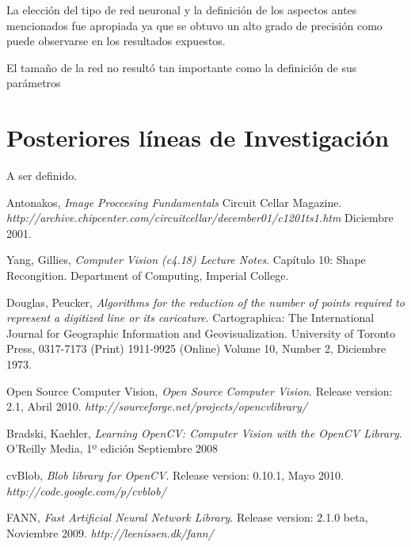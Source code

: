 \documentclass[pdftex,a4paper,12pt]{article}
\begin{document}
	La elecci\'on del tipo de red neuronal y la definici\'on de los aspectos antes mencionados
	fue apropiada ya que se obtuvo un alto grado de precisi\'on como puede observarse
	en los resultados expuestos.
	
	El tama\~no de la red no result\'o tan importante como la definici\'on de sus par\'ametros

\section{Posteriores l\'ineas de Investigaci\'on} %
A ser definido.

\newpage


\begin{thebibliography}{9}

  Antonakos,
  \emph{Image Proccesing Fundamentals}
  Circuit Cellar Magazine.
  \textsl{http://archive.chipcenter.com/circuitcellar/december01/c1201ts1.htm}
  Diciembre 2001.

  Yang, Gillies,  
  \emph{Computer Vision (c4.18) Lecture Notes}.
  Cap\'itulo 10: Shape Recongition.
  Department of Computing, Imperial College. 
  
  Douglas, Peucker, 
  \emph{Algorithms for the reduction of the number of points required to represent a digitized line or its caricature}. Cartographica: The International Journal for Geographic Information and Geovisualization.
  University of Toronto Press,
  0317-7173 (Print) 1911-9925 (Online)
  Volume 10, Number 2,
  Diciembre 1973.

  Open Source Computer Vision, 
  \emph{Open Source Computer Vision}. 
  Release version: 2.1, 
  Abril 2010.
  \textsl{http://sourceforge.net/projects/opencvlibrary/}
  
  Bradski, Kaehler,
  \emph{Learning OpenCV: Computer Vision with the OpenCV Library}.
  O'Reilly Media, 1º edici\'on 
  Septiembre 2008
  
  cvBlob, 
  \emph{Blob library for OpenCV}. 
  Release version: 0.10.1, 
  Mayo 2010.
  \textsl{http://code.google.com/p/cvblob/}

  FANN, 
  \emph{Fast Artificial Neural Network Library}. 
  Release version: 2.1.0 beta, 
  Noviembre 2009.
  \textsl{http://leenissen.dk/fann/}
  

\end{thebibliography}

\end{document}
